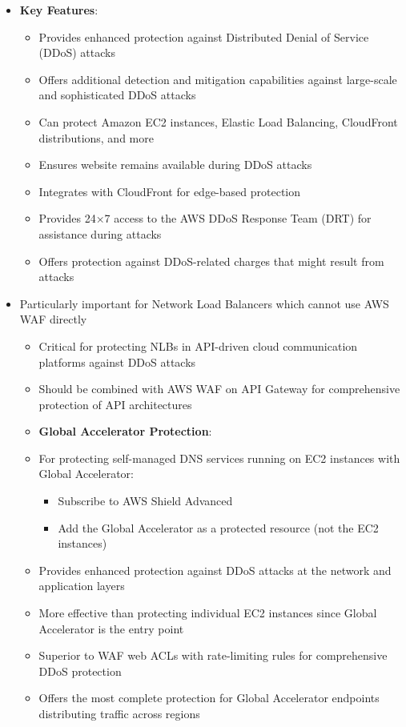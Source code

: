\documentclass[11pt,a4paper]{report}
\begin{document}
\begin{itemize}
  \item \textbf{Key Features}:
\begin{itemize}
  \item Provides enhanced protection against Distributed Denial of Service (DDoS) attacks
  \item Offers additional detection and mitigation capabilities against large-scale and sophisticated DDoS attacks
  \item Can protect Amazon EC2 instances, Elastic Load Balancing, CloudFront distributions, and more
  \item Ensures website remains available during DDoS attacks
  \item Integrates with CloudFront for edge-based protection
  \item Provides 24×7 access to the AWS DDoS Response Team (DRT) for assistance during attacks
  \item Offers protection against DDoS-related charges that might result from attacks
\end{itemize}
  \item Particularly important for Network Load Balancers which cannot use AWS WAF directly
\begin{itemize}
  \item Critical for protecting NLBs in API-driven cloud communication platforms against DDoS attacks
  \item Should be combined with AWS WAF on API Gateway for comprehensive protection of API architectures
  \item \textbf{Global Accelerator Protection}:
  \item For protecting self-managed DNS services running on EC2 instances with Global Accelerator:
\begin{itemize}
  \item Subscribe to AWS Shield Advanced
  \item Add the Global Accelerator as a protected resource (not the EC2 instances)
\end{itemize}
  \item Provides enhanced protection against DDoS attacks at the network and application layers
  \item More effective than protecting individual EC2 instances since Global Accelerator is the entry point
  \item Superior to WAF web ACLs with rate-limiting rules for comprehensive DDoS protection
  \item Offers the most complete protection for Global Accelerator endpoints distributing traffic across regions

\end{itemize}
\end{itemize}
\end{document}
